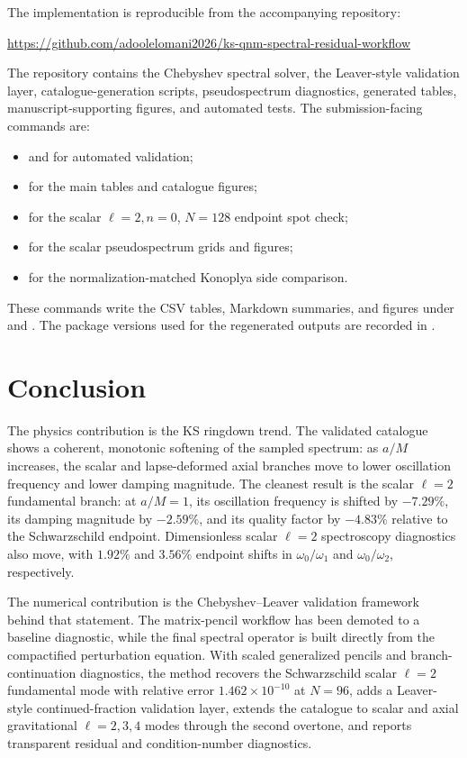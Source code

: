 ﻿\documentclass[12pt,a4paper]{article}
\begin{document}
The implementation is reproducible from the accompanying repository:
\begin{center}
\url{https://github.com/adoolelomani2026/ks-qnm-spectral-residual-workflow}
\end{center}
The repository contains the Chebyshev spectral solver, the Leaver-style validation layer, catalogue-generation scripts, pseudospectrum diagnostics, generated tables, manuscript-supporting figures, and automated tests. The submission-facing commands are:
\begin{itemize}
\item {} and  for automated validation;
\item {} for the main tables and catalogue figures;
\item {} for the scalar \(\ell=2,n=0\), \(N=128\) endpoint spot check;
\item {} for the scalar pseudospectrum grids and figures;
\item {} for the normalization-matched Konoplya side comparison.
\end{itemize}
These commands write the CSV tables, Markdown summaries, and figures under  and . The package versions used for the regenerated outputs are recorded in .

\section{Conclusion}

The physics contribution is the KS ringdown trend. The validated catalogue shows a coherent, monotonic softening of the sampled spectrum: as \(a/M\) increases, the scalar and lapse-deformed axial branches move to lower oscillation frequency and lower damping magnitude. The cleanest result is the scalar \(\ell=2\) fundamental branch: at \(a/M=1\), its oscillation frequency is shifted by \(-7.29\%\), its damping magnitude by \(-2.59\%\), and its quality factor by \(-4.83\%\) relative to the Schwarzschild endpoint. Dimensionless scalar \(\ell=2\) spectroscopy diagnostics also move, with \(1.92\%\) and \(3.56\%\) endpoint shifts in \(\omega_0/\omega_1\) and \(\omega_0/\omega_2\), respectively.

The numerical contribution is the Chebyshev--Leaver validation framework behind that statement. The matrix-pencil workflow has been demoted to a baseline diagnostic, while the final spectral operator is built directly from the compactified perturbation equation. With scaled generalized pencils and branch-continuation diagnostics, the method recovers the Schwarzschild scalar \(\ell=2\) fundamental mode with relative error \(1.462\times10^{-10}\) at \(N=96\), adds a Leaver-style continued-fraction validation layer, extends the catalogue to scalar and axial gravitational \(\ell=2,3,4\) modes through the second overtone, and reports transparent residual and condition-number diagnostics.
\end{document}
